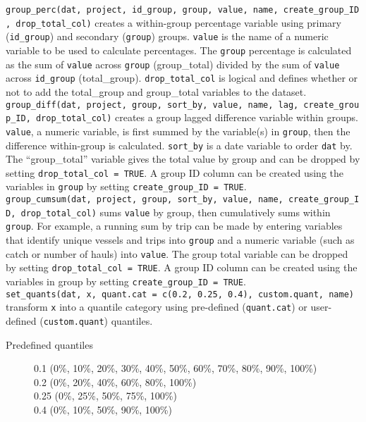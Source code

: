 \documentclass[
]{article}
\begin{document}
\texttt{group\_perc(dat,\ project,\ id\_group,\ group,\ value,\ name,\ create\_group\_ID,\ drop\_total\_col)} creates a within-group percentage variable using primary (\texttt{id\_group}) and secondary (\texttt{group}) groups. \texttt{value} is the name of a numeric variable to be used to calculate percentages. The \texttt{group} percentage is calculated as the sum of \texttt{value} across \texttt{group} (group\_total) divided by the sum of \texttt{value} across \texttt{id\_group} (total\_group). \texttt{drop\_total\_col} is logical and defines whether or not to add the total\_group and group\_total variables to the dataset.\\
\texttt{group\_diff(dat,\ project,\ group,\ sort\_by,\ value,\ name,\ lag,\ create\_group\_ID,\ drop\_total\_col)} creates a group lagged difference variable within groups. \texttt{value}, a numeric variable, is first summed by the variable(s) in \texttt{group}, then the difference within-group is calculated. \texttt{sort\_by} is a date variable to order \texttt{dat} by. The ``group\_total'' variable gives the total value by group and can be dropped by setting \texttt{drop\_total\_col\ =\ TRUE}. A group ID column can be created using the variables in \texttt{group} by setting \texttt{create\_group\_ID\ =\ TRUE}.\\
\texttt{group\_cumsum(dat,\ project,\ group,\ sort\_by,\ value,\ name,\ create\_group\_ID,\ drop\_total\_col)} sums \texttt{value} by group, then cumulatively sums within \texttt{group}. For example, a running sum by trip can be made by entering variables that identify unique vessels and trips into \texttt{group} and a numeric variable (such as catch or number of hauls) into \texttt{value}. The group total variable can be dropped by setting \texttt{drop\_total\_col\ =\ TRUE}. A group ID column can be created using the variables in group by setting \texttt{create\_group\_ID\ =\ TRUE}.\\
\texttt{set\_quants(dat,\ x,\ quant.cat\ =\ c(0.2,\ 0.25,\ 0.4),\ custom.quant,\ name)} transform \texttt{x} into a quantile category using pre-defined (\texttt{quant.cat}) or user-defined (\texttt{custom.quant}) quantiles.

\begin{description}
\item[Predefined quantiles]
0.1 (0\%, 10\%, 20\%, 30\%, 40\%, 50\%, 60\%, 70\%, 80\%, 90\%, 100\%)\\
0.2 (0\%, 20\%, 40\%, 60\%, 80\%, 100\%)\\
0.25 (0\%, 25\%, 50\%, 75\%, 100\%)\\
0.4 (0\%, 10\%, 50\%, 90\%, 100\%)
\end{description}
\end{document}
